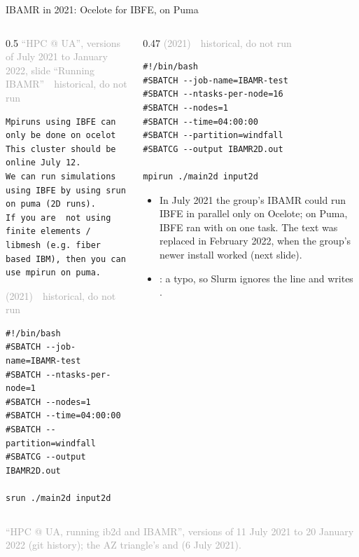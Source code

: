 \documentclass[aspectratio=169,11pt]{beamer}
\newcommand{\sourcecredit}[1]{\vfill\begin{flushright}\tiny\textcolor{DarkGray}{#1}\end{flushright}}
\newcommand{\hist}[1]{{\tiny\sffamily\textcolor{DarkGray}{#1\ \textbullet\ historical, do not run}}\par\nointerlineskip\vspace{0.3mm}}
\begin{document}
\begin{frame}[fragile]{IBAMR in 2021: Ocelote for IBFE,  on Puma}
\label{fr:ibamr2021}
\begin{columns}[T,onlytextwidth]
\begin{column}{0.5\textwidth}
\hist{``HPC @ UA'', versions of July 2021 to January 2022, slide ``Running IBAMR''}
\begin{lstlisting}[style=hist]
Mpiruns using IBFE can only be done on ocelot
This cluster should be online July 12.
We can run simulations using IBFE by using srun on puma (2D runs).
If you are  not using finite elements / libmesh (e.g. fiber based IBM), then you can use mpirun on puma.
\end{lstlisting}
\hist{ (2021)}
\begin{lstlisting}[style=hist]
#!/bin/bash
#SBATCH --job-name=IBAMR-test
#SBATCH --ntasks-per-node=1
#SBATCH --nodes=1
#SBATCH --time=04:00:00
#SBATCH --partition=windfall
#SBATCG --output IBAMR2D.out

srun ./main2d input2d
\end{lstlisting}
\end{column}
\begin{column}{0.47\textwidth}
\hist{ (2021)}
\begin{lstlisting}[style=hist]
#!/bin/bash
#SBATCH --job-name=IBAMR-test
#SBATCH --ntasks-per-node=16
#SBATCH --nodes=1
#SBATCH --time=04:00:00
#SBATCH --partition=windfall
#SBATCG --output IBAMR2D.out

mpirun ./main2d input2d
\end{lstlisting}
\footnotesize
\begin{itemize}\setlength{\itemsep}{2pt}
  \item In July 2021 the group's IBAMR could run IBFE in parallel only on Ocelote; on Puma, IBFE ran with  on one task. The text was replaced in February 2022, when the group's newer install worked (next slide).
  \item {}: a typo, so Slurm ignores the line and writes .
\end{itemize}
\end{column}
\end{columns}
\sourcecredit{``HPC @ UA, running ib2d and IBAMR'', versions of 11 July 2021 to 20 January 2022 (git history); the AZ triangle's \code{ocelot\_script.sh} and \code{puma\_script.sh} (6 July 2021).}
\end{frame}
\end{document}
